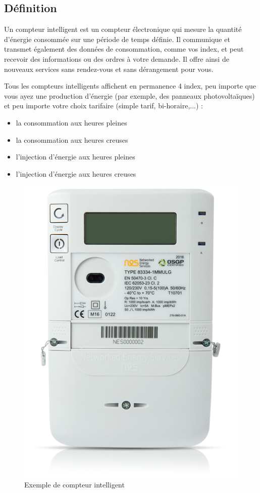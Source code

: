 \subsection{Définition}
Un compteur intelligent est un compteur électronique qui mesure la quantité d'énergie consommée sur une période de temps définie. Il communique et transmet également des données de consommation, comme vos index, et peut recevoir des informations ou des ordres à votre demande. Il offre ainsi de nouveaux services sans rendez-vous et sans dérangement pour vous. 

Tous les compteurs intelligents affichent en permanence 4 index, peu importe que vous ayez une production d'énergie (par exemple, des panneaux photovoltaïques) et peu importe votre choix tarifaire (simple tarif, bi-horaire,...)  : 

\begin{itemize}[label=\textbullet]
\item la consommation aux heures pleines 
\item la consommation aux heures creuses 
\item l'injection d'énergie aux heures pleines 
\item l'injection d'énergie aux heures creuses
\end{itemize}

\begin{figure}[h]
	\centering
    \includegraphics[scale=0.4]{img/part2/1.4}
    \caption{Exemple de compteur intelligent}
\end{figure}